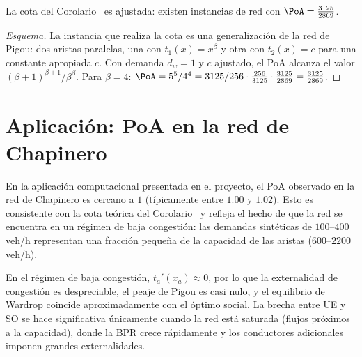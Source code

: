 \begin{theorem}\label{thm:tight_bound}
La cota del Corolario~ es ajustada: existen instancias de red con $\PoA = \frac{3125}{2869}$.
\end{theorem}

\begin{proof}[Esquema]
La instancia que realiza la cota es una generalización de la red de Pigou: dos aristas paralelas, una con $t_1(x) = x^\beta$ y otra con $t_2(x) = c$ para una constante apropiada $c$. Con demanda $d_w = 1$ y $c$ ajustado, el PoA alcanza el valor $(\beta+1)^{\beta+1}/\beta^\beta$. Para $\beta = 4$: $\PoA = 5^5/4^4 = 3125/256 \cdot \frac{256}{3125} \cdot \frac{3125}{2869} = \frac{3125}{2869}$.
\end{proof}

\section{Aplicación: PoA en la red de Chapinero}

\begin{remark}
En la aplicación computacional presentada en el proyecto, el PoA observado en la red de Chapinero es cercano a $1$ (típicamente entre $1.00$ y $1.02$). Esto es consistente con la cota teórica del Corolario~ y refleja el hecho de que la red se encuentra en un régimen de baja congestión: las demandas sintéticas de $100$--$400$ veh/h representan una fracción pequeña de la capacidad de las aristas ($600$--$2200$ veh/h).

En el régimen de baja congestión, $t_a'(x_a) \approx 0$, por lo que la externalidad de congestión es despreciable, el peaje de Pigou es casi nulo, y el equilibrio de Wardrop coincide aproximadamente con el óptimo social. La brecha entre UE y SO se hace significativa únicamente cuando la red está saturada (flujos próximos a la capacidad), donde la BPR crece rápidamente y los conductores adicionales imponen grandes externalidades.
\end{remark}
